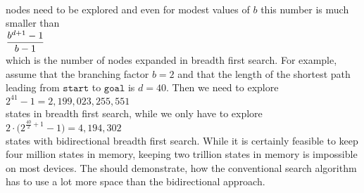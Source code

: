 \\[0.2cm]
nodes need to be explored and even for modest values of $b$ this number is much smaller than
\\[0.2cm]
\hspace*{1.3cm}
$\displaystyle\frac{b^{d+1} - 1}{b - 1}$
\\[0.2cm]
which is the number of nodes expanded in breadth first search.  For example, assume that the branching factor
$b = 2$ and that the length of the shortest path leading from $\texttt{start}$ to $\texttt{goal}$
is $d = 40$.  Then we need to explore
\\[0.2cm]
\hspace*{1.3cm}
$2^{41} - 1 = 2,199,023,255,551$
\\[0.2cm]
states in breadth first search, while we only have to explore
\\[0.2cm]
\hspace*{1.3cm}
$2 \cdot \bigl(2^{\frac{40}{2}+1} - 1\bigr) = 4,194,302 $
\\[0.2cm]
states with bidirectional breadth first search.  While it is certainly feasible to keep four million states in memory,
keeping two trillion states in memory is impossible on most devices.  The  should
demonstrate, how the conventional search algorithm has to use a lot more space than the bidirectional approach.

